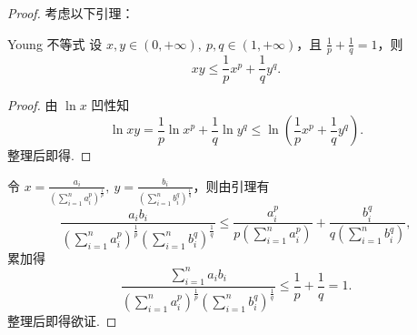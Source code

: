 \begin{proof}
    考虑以下引理：
    \begin{center}
        \begin{minipage}{0.85\textwidth}
            \begin{lemma}{Young 不等式}{}
                设 $x, y \in (0, +\infty),\ p, q \in (1, +\infty)$，且 $\frac 1 p + \frac 1 q = 1$，则
                \[
                    xy \leqslant \frac 1 p x^p + \frac 1 q y^q.
                \]
                \tcblower
                \begin{proof}
                    由 $\ln x$ 凹性知
                    \[
                        \ln xy = \frac 1 p \ln x^p + \frac 1 q \ln y^q \leqslant \ln\left( \frac 1 p x^p + \frac 1 q y^q \right).
                    \]
                    整理后即得.
                \end{proof}
            \end{lemma}
        \end{minipage}
    \end{center}
    令 $x = \frac{a_i}{\left( \sum_{i=1}^n a_i^p \right)^{\frac 1 p}},\ y = \frac{b_i}{\left( \sum_{i=1}^n b_i^q \right)^{\frac 1 q}}$，则由引理有
    \[
        \frac{a_ib_i}{\left( \sum_{i=1}^n a_i^p \right)^{\frac 1 p} \left( \sum_{i=1}^n b_i^q \right)^{\frac 1 q}} \leqslant \frac{a_i^p}{p \left( \sum_{i=1}^n a_i^p \right)} + \frac{b_i^q}{q \left( \sum_{i=1}^n b_i^q \right)},
    \]
    累加得
    \[
        \frac{\sum_{i=1}^n a_ib_i}{\left( \sum_{i=1}^n a_i^p \right)^{\frac 1 p} \left( \sum_{i=1}^n b_i^q \right)^{\frac 1 q}} \leqslant \frac 1 p + \frac 1 q = 1.
    \]
    整理后即得欲证.
\end{proof}